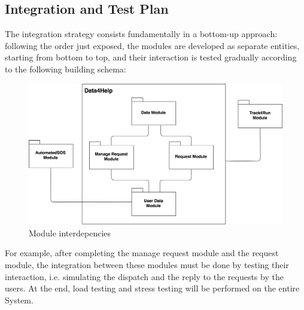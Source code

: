 \subsection{Integration and Test Plan}
The integration strategy consists fundamentally in a bottom-up approach: following the order just exposed, the modules are developed as separate entities, starting from bottom to top, and their interaction is tested gradually according to the following building schema:

\begin{figure}[H]
\includegraphics[scale=0.2,keepaspectratio]{./Pictures/integration.png}
\centering
\caption{Module interdepencies}
\end{figure}
 
For example, after completing the manage request module and the request module, the integration between these modules must be done by testing their interaction, i.e. simulating the dispatch and the reply to the requests by the users. 
At the end, load testing and stress testing will be performed on the entire System.

